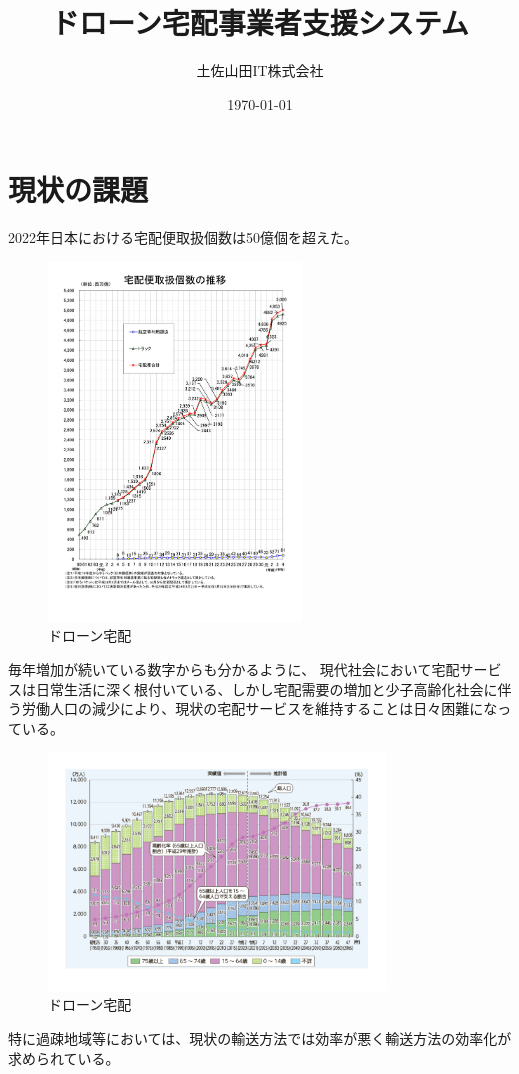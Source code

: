 \documentclass[a4paper, titlepage]{jsarticle}
\date{\today}
\title{ドローン宅配事業者支援システム}
\author{土佐山田IT株式会社}
\begin{document}
\maketitle

\tableofcontents

\clearpage

\section{現状の課題}
2022年日本における宅配便取扱個数は50億個を超えた。
\begin{figure}[H]
    \centering
    \includegraphics[width=0.6\textwidth]{./home_delivery.pdf}
    \caption{ドローン宅配}
    \label{fig:delivery}
\end{figure}
毎年増加が続いている数字からも分かるように、
現代社会において宅配サービスは日常生活に深く根付いている、しかし宅配需要の増加と少子高齢化社会に伴う労働人口の減少により、現状の宅配サービスを維持することは日々困難になっている。
\begin{figure}[H]
    \centering
    \includegraphics[width=0.8\textwidth]{./working_population.pdf}
    \caption{ドローン宅配}
    \label{fig:delivery}
\end{figure}
特に過疎地域等においては、現状の輸送方法では効率が悪く輸送方法の効率化が求められている。
\end{document}
